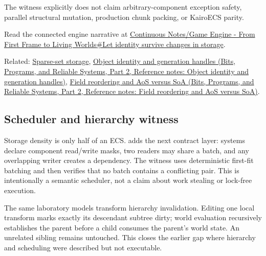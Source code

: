 The witness explicitly does not claim arbitrary-component exception safety, parallel structural mutation, production chunk packing, or KairoECS parity.

Read the connected engine narrative at \hyperref[05-engine-i-ch014-let-identity-survive-changes-in-storage]{Continuous Notes/Game Engine - From First Frame to Living Worlds\#Let identity survive changes in storage}.

Related: \hyperref[appendix-8404d0b1a3e7]{Sparse-set storage}, \href{../01-Bits-Programs-and-Reliable-Systems-P02/main.pdf\#nameddest=appendix-f1581457d322}{Object identity and generation handles (Bits, Programs, and Reliable Systems, Part 2, Reference notes: Object identity and generation handles)}, \href{../01-Bits-Programs-and-Reliable-Systems-P02/main.pdf\#nameddest=appendix-5522ad176ca0}{Field reordering and AoS versus SoA (Bits, Programs, and Reliable Systems, Part 2, Reference notes: Field reordering and AoS versus SoA)}.

\subsection{Scheduler and hierarchy witness}\label{appendix-fbfeb0430008-scheduler-and-hierarchy-witness}

\hypertarget{appendix-fbfeb0430008-scheduler-and-hierarchy-witness}{}

Storage density is only half of an ECS.  adds the next contract layer: systems declare component read/write masks, two readers may share a batch, and any overlapping writer creates a dependency. The witness uses deterministic first-fit batching and then verifies that no batch contains a conflicting pair. This is intentionally a semantic scheduler, not a claim about work stealing or lock-free execution.

The same laboratory models transform hierarchy invalidation. Editing one local transform marks exactly its descendant subtree dirty; world evaluation recursively establishes the parent before a child consumes the parent's world state. An unrelated sibling remains untouched. This closes the earlier gap where hierarchy and scheduling were described but not executable.
